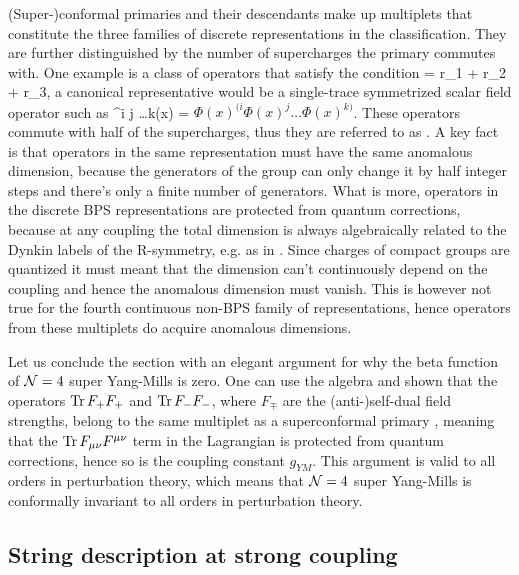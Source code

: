 (Super-)conformal primaries and their descendants make up multiplets that constitute the three families of discrete representations in the classification.
They are further distinguished by the number of supercharges the primary commutes with.
One example is a class of operators that satisfy the condition 
\beq
	\label{eq:halfBPS}
	\Delta = r_1 + r_2 + r_3,
\eeq 
a canonical representative would be a single-trace symmetrized scalar field operator such as 
\beq
	^{i j \dots k}(x) = \tr \( \Phi(x)^{(i} \Phi(x)^j \dots \Phi(x)^{k)} \).
\eeq
These operators commute with half of the supercharges, thus they are referred to as . 
A key fact is that operators in the same representation must have the same anomalous dimension, because the generators of the group can only change it by half integer steps and there's only a finite number of generators. 
What is more, operators in the discrete BPS representations are protected from quantum corrections, because at any coupling the total dimension is always algebraically related to the Dynkin labels of the R-symmetry, e.g. as in . 
Since charges of compact groups are quantized it must meant that the dimension can't continuously depend on the coupling and hence the anomalous dimension must vanish. 
This is however not true for the fourth continuous non-BPS family of representations, hence operators from these multiplets do acquire anomalous dimensions.

Let us conclude the section with an elegant argument for why the beta function of $\mathcal{N}=4$ super Yang-Mills is zero.
One can use the algebra and shown that the operators $\mathrm{Tr} \, F_+ F_+$ and $\mathrm{Tr} \, F_- F_- $, where $F_\mp$ are the (anti-)self-dual field strengths, belong to the same multiplet as a superconformal primary \cite{Minahan:2010js}, meaning that the $\mathrm{Tr} \, F_{\mu\nu} F^{\mu\nu}$ term in the Lagrangian is protected from quantum corrections, hence so is the coupling constant $g_{YM}$. 
This argument is valid to all orders in perturbation theory, which means that $\mathcal{N}=4$ super Yang-Mills is conformally invariant to all orders in perturbation theory.

\subsection{String description at strong coupling}
\label{sec:n4_strong}

